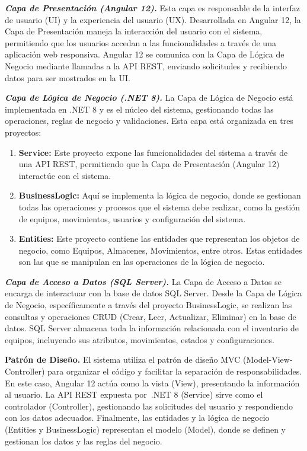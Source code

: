 \documentclass[stu, 12pt, letterpaper, donotrepeattitle, floatsintext, natbib]{apa7}
\begin{document}
\textit{\textbf{Capa de Presentación (Angular 12). }}Esta capa es responsable de la interfaz de usuario (UI) y la experiencia del usuario (UX).
Desarrollada en Angular 12, la Capa de Presentación maneja la interacción del usuario con el sistema, permitiendo que los usuarios accedan a
las funcionalidades a través de una aplicación web responsiva. Angular 12 se comunica con la Capa de Lógica de Negocio mediante llamadas a la
API REST, enviando solicitudes y recibiendo datos para ser mostrados en la UI.

\textit{\textbf{Capa de Lógica de Negocio (.NET 8). }}La Capa de Lógica de Negocio está implementada en .NET 8 y es el núcleo del sistema,
gestionando todas las operaciones, reglas de negocio y validaciones. Esta capa está organizada en tres proyectos:
\begin{enumerate}
    \item\textbf{Service: } Este proyecto expone las funcionalidades del sistema a través de una API REST, permitiendo que la Capa de
          Presentación (Angular 12) interactúe con el sistema.
    \item\textbf{BusinessLogic: }Aquí se implementa la lógica de negocio, donde se gestionan todas las operaciones y procesos que el sistema
          debe realizar, como la gestión de equipos, movimientos, usuarios y configuración del sistema.
    \item\textbf{Entities: }Este proyecto contiene las entidades que representan los objetos de negocio, como Equipos, Almacenes, Movimientos,
          entre otros. Estas entidades son las que se manipulan en las operaciones de la lógica de negocio.
\end{enumerate}

\textit{\textbf{Capa de Acceso a Datos (SQL Server). }}La Capa de Acceso a Datos se encarga de interactuar con la base de datos SQL Server.
Desde la Capa de Lógica de Negocio, específicamente a través del proyecto BusinessLogic, se realizan las consultas y operaciones CRUD (Crear,
Leer, Actualizar, Eliminar) en la base de datos. SQL Server almacena toda la información relacionada con el inventario de equipos, incluyendo
sus atributos, movimientos, estados y configuraciones.

\textbf{Patrón de Diseño. }El sistema utiliza el patrón de diseño MVC (Model-View-Controller) para organizar el código y facilitar la
separación de responsabilidades. En este caso, Angular 12 actúa como la vista (View), presentando la información al usuario. La API REST
expuesta por~.NET 8 (Service) sirve como el controlador (Controller), gestionando las solicitudes del usuario y respondiendo con los datos
adecuados. Finalmente, las entidades y la lógica de negocio (Entities y BusinessLogic) representan el modelo (Model), donde se definen y
gestionan los datos y las reglas del negocio.
\end{document}

